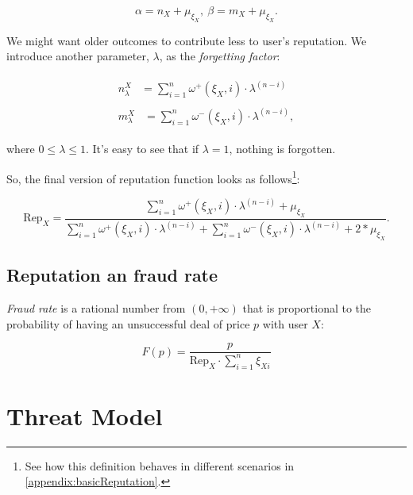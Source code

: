 \documentclass[11pt]{article}
\begin{document}
\begin{equation} \label{alphaBetaRefined}
\alpha = n_{X} + \mu_{\xi_X},\ \beta = m_{X} + \mu_{\xi_X}.
\end{equation}

We might want older outcomes to contribute less to user's reputation. We introduce another parameter, $ \lambda $, as the \textit{forgetting factor}:

\begin{align}
\begin{split}
n_{\lambda}^{X} {}& = \sum_{i = 1}^{n} \omega^{+}(\xi_X, i) \cdot \lambda^{(n - i)}
\end{split} \\
\begin{split}
m_{\lambda}^{X} {}& = \sum_{i = 1}^{n} \omega^{-}(\xi_X, i) \cdot \lambda^{(n - i)},
\end{split}
\end{align}

where $ 0 \leq \lambda \leq 1 $. It's easy to see that if $ \lambda = 1 $, nothing is forgotten.

So, the final version of reputation function looks as follows\footnote{See how this definition behaves in different scenarios in \ref{appendix:basicReputation}.}:

\begin{equation} \label{reputationFunctionRefined}
\text{Rep}_{X} = \frac{\sum_{i = 1}^{n} \omega^{+}(\xi_X, i) \cdot \lambda^{(n - i)} + \mu_{\xi_X}}{\sum_{i = 1}^{n} \omega^{+}(\xi_X, i) \cdot \lambda^{(n - i)} + \sum_{i = 1}^{n} \omega^{-}(\xi_X, i) \cdot \lambda^{(n - i)} + 2 * \mu_{\xi_X}}.
\end{equation}

\bigskip

\subsection{Reputation an fraud rate} \label{reputation:fraudRate}

\textit{Fraud rate} is a rational number from $ (0, +\infty) $ that is proportional to the probability of having an unsuccessful deal of price $ p $ with user $ X $:

\begin{equation} \label{reputationFunction}
F(p) = \frac{p}{\text{Rep}_X \cdot \sum_{i=1}^{n}\xi_{Xi}}
\end{equation}

\section{Threat Model} \label{threatModel}
\end{document}
